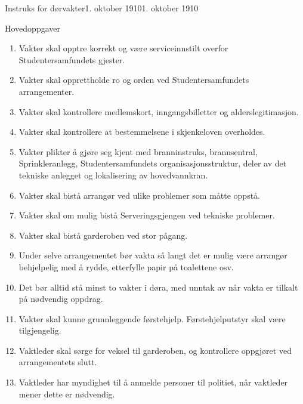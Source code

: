 \begin{instruks}{Instruks for dørvakter}{1. oktober 1910}{1. oktober 1910}
    \begin{instruksledd}{Hovedoppgaver}
        \begin{enumerate}
            \item Vakter skal opptre korrekt og være serviceinnstilt overfor Studentersamfundets gjester.
            \item Vakter skal opprettholde ro og orden ved Studentersamfundets arrangementer.
            \item Vakter skal kontrollere medlemskort, inngangsbilletter og alderslegitimasjon.
            \item Vakter skal kontrollere at bestemmelsene i skjenkeloven overholdes.
            \item Vakter plikter å gjøre seg kjent med branninstruks, brannsentral, Sprinkleranlegg, Studentersamfundets
                organisasjonsstruktur, deler av det tekniske anlegget og lokalisering av hovedvannkran.
            \item Vakter skal bistå arrangør ved ulike problemer som måtte oppstå.
            \item Vakter skal om mulig bistå Serveringsgjengen ved tekniske problemer.
            \item Vakter skal bistå garderoben ved stor pågang.
            \item Under selve arrangementet bør vakta så langt det er mulig være arrangør behjelpelig med å rydde, etterfylle
                papir på toalettene osv.
            \item Det bør alltid stå minst to vakter i døra, med unntak av når vakta er tilkalt på nødvendig oppdrag.
            \item Vakter skal kunne grunnleggende førstehjelp. Førstehjelputstyr skal være tilgjengelig.
            \item Vaktleder skal sørge for veksel til garderoben, og kontrollere oppgjøret ved arrangementets slutt. 
            \item Vaktleder har myndighet til å anmelde personer til politiet, når vaktleder mener dette er nødvendig.
        \end{enumerate}
    \end{instruksledd}


\end{instruks}
